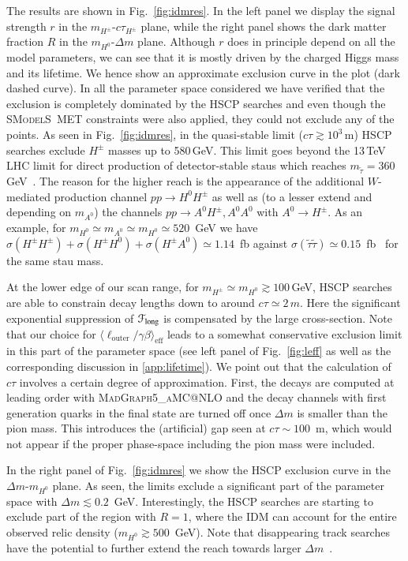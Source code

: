 \documentclass[preprint,number,sort&compress,twocolumn,3p]{elsstyarticle}
\newcommand{\Hn}{{H^0}}
\newcommand{\An}{A^0}
\newcommand{\Hp}{{H^\pm}}
\newcommand{\smo}{\textsc{SModelS}}
\begin{document}
The results are shown in Fig.~\ref{fig:idmres}.
In the left panel we display the signal strength $r$
in the $m_\Hp$-$c\tau_{H^\pm}$ plane, while the right panel shows
the dark matter fraction $R$ in the $m_\Hn$-$\Delta m$ plane.
Although $r$ does in principle depend on all the model parameters,
we can see that it is mostly driven by the charged Higgs mass and its lifetime. We hence show an approximate exclusion curve in
the plot (dark dashed curve). 
In all the parameter space considered we have verified that
the exclusion is completely dominated by the HSCP searches and even though the \smo\ MET constraints were also applied, they could not
exclude any of the points.
As seen in Fig.~\ref{fig:idmres}, in the quasi-stable limit ($c\tau\gtrsim10^3\,$m) HSCP searches exclude $\Hp$ masses up to 580\,GeV.
This limit goes beyond the 13\,TeV LHC limit for direct production of detector-stable staus which reaches 
$m_{\tilde\tau} = 360\,$GeV~\cite{CMS-PAS-EXO-16-036}. The reason for the higher reach is the appearance of 
the additional $W$-mediated production channel $p p \to \Hn\Hp$ as well as (to a lesser extend and depending on $m_{\An}$)
the channels $p p \to \An\Hp, \An \An$ with  $\An\to\Hp$.
As an example, for $m_{\Hn} \simeq m_{\An} \simeq m_{\Hn} \simeq 520$~GeV
we have $\sigma(\Hp \Hp) + \sigma(\Hp \Hn) + \sigma(\Hp \An) \simeq 1.14$~fb against $\sigma(\tilde\tau\tilde\tau) \simeq 0.15$~fb~\cite{CMS-PAS-EXO-16-036} for the same stau mass.

At the lower edge of our scan range, for $m_\Hp\simeq m_\Hn\gtrsim100\,$GeV, HSCP searches are able to constrain
decay lengths down to around $c \tau \simeq 2\,m$.
Here the significant exponential suppression of ${\cal F}_\text{long}$ is
compensated by the large cross-section. Note that our choice for $\langle\ell_\text{outer}/\gamma\beta\rangle_\text{eff}$
leads to a somewhat conservative exclusion limit in this part of the parameter space (see left panel of Fig.~\ref{fig:leff}
as well as the corresponding discussion in \ref{app:lifetime}). 
We point out that the calculation of $ c\tau$ involves a certain degree of approximation. First, the decays are computed at leading order with \textsc{MadGraph5\_aMC@NLO} and the decay channels with first generation quarks in the final state are turned off once $\Delta m$ is smaller
than the pion mass.
This introduces the (artificial) gap seen at $c \tau \sim 100$~m, which would not appear if the proper phase-space including the pion mass were included.



In the right panel of Fig.~\ref{fig:idmres} we show the HSCP exclusion curve in the $\Delta m$-$m_{\Hn}$ plane.
As seen, the limits exclude a significant part of the parameter space with $\Delta m \lesssim 0.2\,$ GeV. Interestingly, the HSCP searches are starting to exclude part of the region with $R=1$, where the IDM can account for the entire observed relic density ($m_{\Hn} \gtrsim 500$~GeV). 
Note that disappearing track searches have the potential to further extend the reach towards larger $\Delta m$~\cite{Belyaev:2016lok}.  
\end{document}

